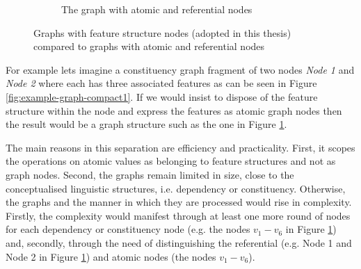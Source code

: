 \begin{figure}[!ht]
\begin{subfigure}[b]{0.45\textwidth}
            \caption{The graph with atomic and referential nodes}
            \label{fig:example-graph-compact2}
        \end{subfigure}%
        \caption{Graphs with feature structure nodes (adopted in this thesis) compared to graphs with atomic and referential nodes}
        \label{fig:example-graph-compact}
    \end{figure}

    For example lets imagine a constituency graph fragment of two nodes \textit{Node 1} and \textit{Node 2} where each has three associated features as can be seen in Figure \ref{fig:example-graph-compact1}. If we would insist to dispose of the feature structure within the node and express the features as atomic graph nodes then the result would be a graph structure such as the one in Figure \ref{fig:example-graph-compact2}.

    The main reasons in this separation are efficiency and practicality. First, it scopes the operations on atomic values as belonging to feature structures and not as graph nodes. Second, the graphs remain limited in size, close to the conceptualised linguistic structures, i.e. dependency or constituency. Otherwise, the graphs and the manner in which they are processed would rise in complexity. Firstly, the complexity would manifest through at least one more round of nodes for each dependency or constituency node (e.g. the nodes $v_1 - v_6$ in Figure \ref{fig:example-graph-compact2}) and, secondly, through the need of distinguishing the referential (e.g. Node 1 and Node 2 in Figure \ref{fig:example-graph-compact2}) and atomic nodes (the nodes $v_1 - v_6$).


